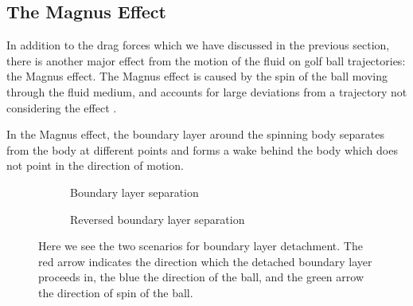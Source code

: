 \subsection{The Magnus Effect}

In addition to the drag forces which we have discussed in the previous section, there is another
major effect from the motion of the fluid on golf ball trajectories: the Magnus effect. The Magnus
effect is caused by the spin of the ball moving through the fluid medium, and accounts for large
deviations from a trajectory not considering the effect \citet{Seifert2012}.

In the Magnus effect, the boundary layer around the spinning body separates from the body at different
points and forms a wake behind the body which does not point in the direction of motion.
\begin{figure}[h]
\centering
\begin{subfigure}{.3\textwidth}
\caption{Boundary layer separation}
\end{subfigure}
\quad \qquad
\begin{subfigure}{.3\textwidth}
\caption{Reversed boundary layer separation}
\end{subfigure}
\caption[Diagram of the separation points in the Magnus Effect]{Here we see the two scenarios for
boundary layer detachment. The red arrow indicates the direction which the detached boundary layer
proceeds in, the blue the direction of the ball, and the green arrow the direction of spin of the
ball.}
\label{separation}
\end{figure}

